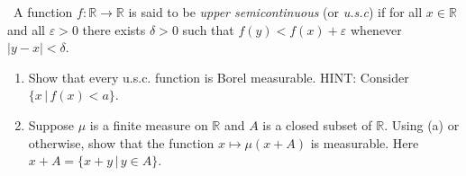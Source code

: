 \documentclass[12pt]{Qual}
\begin{document}
\begin{problem} $\,$
A function $f:\mathbb{R}\to\mathbb{R}$ is said to be \textit{upper semicontinuous} (or \textit{u.s.c}) if for all $x\in\mathbb{R}$ and all $\varepsilon>0$ there exists $\delta>0$ such that $f(y)<f(x)+\varepsilon$ whenever $|y-x|<\delta$.
\begin{enumerate}[label=(\alph*)]
    \item Show that every u.s.c. function is Borel measurable. HINT: Consider $\{x\,|\,f(x)<a\}$.
    \item Suppose $\mu$ is a finite measure on $\mathbb{R}$ and $A$ is a closed subset of $\mathbb{R}$. Using (a) or otherwise, show that the function $x\mapsto\mu(x+A)$ is measurable. Here $x+A=\{x+y\,|\,y\in A\}$.
 \end{enumerate}
\end{problem}
\end{document}
